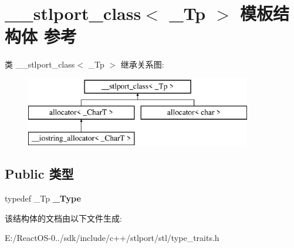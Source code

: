 \hypertarget{struct____stlport__class}{}\section{\+\_\+\+\_\+stlport\+\_\+class$<$ \+\_\+\+Tp $>$ 模板结构体 参考}
\label{struct____stlport__class}
类 \+\_\+\+\_\+stlport\+\_\+class$<$ \+\_\+\+Tp $>$ 继承关系图\+:\begin{figure}[H]
\begin{center}
\leavevmode
\includegraphics[height=3.000000cm]{struct____stlport__class}
\end{center}
\end{figure}
\subsection*{Public 类型}
\begin{DoxyCompactItemize}
\item 
\mbox{\label{struct____stlport__class_a77c12657ff9c431ff168633852ba00f8}} 
typedef \+\_\+\+Tp {\bfseries \+\_\+\+Type}
\end{DoxyCompactItemize}


该结构体的文档由以下文件生成\+:\begin{DoxyCompactItemize}
\item 
E\+:/\+React\+O\+S-\/0../sdk/include/c++/stlport/stl/type\+\_\+traits.\+h\end{DoxyCompactItemize}

